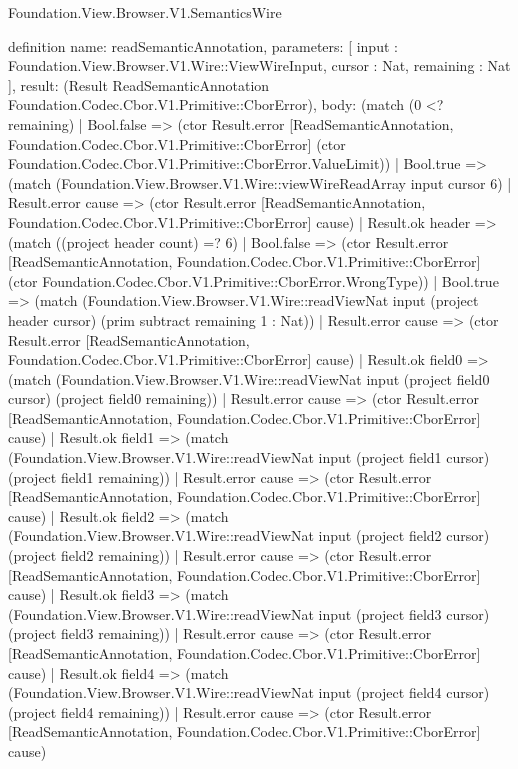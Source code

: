 \begin{lexlean}{Foundation.View.Browser.V1.SemanticsWire}
\begin{semanticmodule}
definition{
  name: readSemanticAnnotation,
  parameters: [
    input : Foundation.View.Browser.V1.Wire::ViewWireInput,
    cursor : Nat,
    remaining : Nat
  ],
  result: (Result ReadSemanticAnnotation Foundation.Codec.Cbor.V1.Primitive::CborError),
  body: (match (0 <? remaining)
    | Bool.false => (ctor Result.error [ReadSemanticAnnotation, Foundation.Codec.Cbor.V1.Primitive::CborError] (ctor Foundation.Codec.Cbor.V1.Primitive::CborError.ValueLimit))
    | Bool.true => (match (Foundation.View.Browser.V1.Wire::viewWireReadArray input cursor 6)
      | Result.error cause => (ctor Result.error [ReadSemanticAnnotation, Foundation.Codec.Cbor.V1.Primitive::CborError] cause)
      | Result.ok header => (match ((project header count) =? 6)
        | Bool.false => (ctor Result.error [ReadSemanticAnnotation, Foundation.Codec.Cbor.V1.Primitive::CborError] (ctor Foundation.Codec.Cbor.V1.Primitive::CborError.WrongType))
        | Bool.true => (match (Foundation.View.Browser.V1.Wire::readViewNat input (project header cursor) (prim subtract remaining 1 : Nat))
          | Result.error cause => (ctor Result.error [ReadSemanticAnnotation, Foundation.Codec.Cbor.V1.Primitive::CborError] cause)
          | Result.ok field0 => (match (Foundation.View.Browser.V1.Wire::readViewNat input (project field0 cursor) (project field0 remaining))
            | Result.error cause => (ctor Result.error [ReadSemanticAnnotation, Foundation.Codec.Cbor.V1.Primitive::CborError] cause)
            | Result.ok field1 => (match (Foundation.View.Browser.V1.Wire::readViewNat input (project field1 cursor) (project field1 remaining))
              | Result.error cause => (ctor Result.error [ReadSemanticAnnotation, Foundation.Codec.Cbor.V1.Primitive::CborError] cause)
              | Result.ok field2 => (match (Foundation.View.Browser.V1.Wire::readViewNat input (project field2 cursor) (project field2 remaining))
                | Result.error cause => (ctor Result.error [ReadSemanticAnnotation, Foundation.Codec.Cbor.V1.Primitive::CborError] cause)
                | Result.ok field3 => (match (Foundation.View.Browser.V1.Wire::readViewNat input (project field3 cursor) (project field3 remaining))
                  | Result.error cause => (ctor Result.error [ReadSemanticAnnotation, Foundation.Codec.Cbor.V1.Primitive::CborError] cause)
                  | Result.ok field4 => (match (Foundation.View.Browser.V1.Wire::readViewNat input (project field4 cursor) (project field4 remaining))
                    | Result.error cause => (ctor Result.error [ReadSemanticAnnotation, Foundation.Codec.Cbor.V1.Primitive::CborError] cause)
}
\end{semanticmodule}
\end{lexlean}
